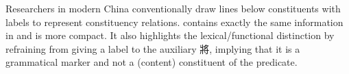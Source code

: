 \documentclass[UTF8, a4paper, oneside, scheme=plain, 12pt]{ctexrep}
\begin{document}
\begin{figure}[H]

\end{figure}

Researchers in modern China conventionally draw lines below constituents with labels to represent constituency relations.
 contains exactly the same information in  and is more compact.
It also highlights the lexical/functional distinction by refraining from giving a label to the  auxiliary 將,
implying that it is a grammatical marker and not a (content) constituent of the predicate.
\end{document}

